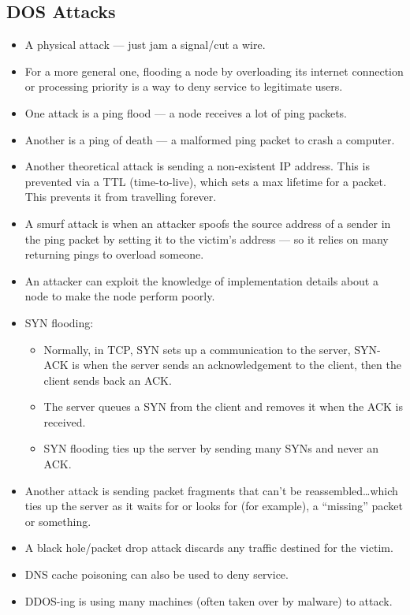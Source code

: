 \documentclass{article}
\begin{document}
\subsection{DOS Attacks}
\begin{itemize}
    \item A physical attack --- just jam a signal/cut a wire.
    \item For a more general one, flooding a node by overloading its internet connection or processing priority is a way to deny service to legitimate users.
    \item One attack is a ping flood --- a node receives a lot of ping packets.
    \item Another is a ping of death --- a malformed ping packet to crash a computer.
    \item Another theoretical attack is sending a non-existent IP address.  This is prevented via a TTL (time-to-live), which sets a max lifetime for a packet.  This prevents it from travelling forever.
    \item A smurf attack is when an attacker spoofs the source address of a sender in the ping packet by setting it to the victim's address --- so it relies on many returning pings to overload someone.
    \item An attacker can exploit the knowledge of implementation details about a node to make the node perform poorly.
    \item SYN flooding:
        \begin{itemize}
            \item Normally, in TCP, SYN sets up a communication to the server, SYN-ACK is when the server sends an acknowledgement to the client, then the client sends back an ACK.
            \item The server queues a SYN from the client and removes it when the ACK is received.
            \item SYN flooding ties up the server by sending many SYNs and never an ACK.
        \end{itemize}
    \item Another attack is sending packet fragments that can't be reassembled\dots which ties up the server as it waits for or looks for (for example), a ``missing'' packet or something.
    \item A black hole/packet drop attack discards any traffic destined for the victim.
    \item DNS cache poisoning can also be used to deny service.
    \item DDOS-ing is using many machines (often taken over by malware) to attack.
\end{itemize}
\end{document}
